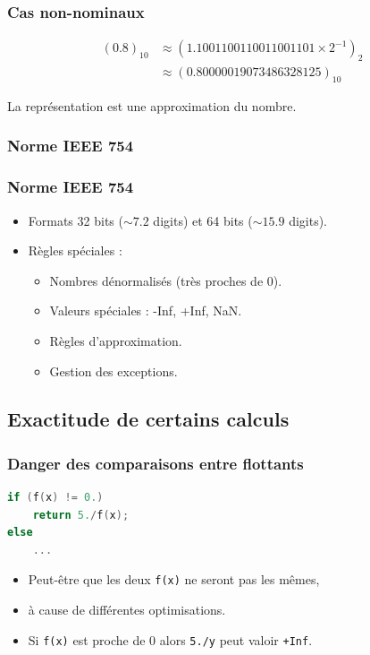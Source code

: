 \documentclass{beamer}
\begin{document}
\begin{frame}
    \frametitle{Cas non-nominaux}

    \begin{displaymath}
        \begin{split}
            (0.8)_{10} & \approx (1.1001100110011001101 \times 2^{-1})_{2} \\
            & \approx (0.80000019073486328125)_{10}
        \end{split}
    \end{displaymath}

    La représentation est une approximation du nombre.
\end{frame}

\subsubsection{Norme IEEE 754}

\begin{frame}
    \frametitle{Norme IEEE 754}

    \begin{itemize}
        \item Formats 32 bits ($\sim 7.2$ digits) et 64 bits ($\sim 15.9$ digits).
        \item Règles spéciales :
              \begin{itemize}
                  \item Nombres dénormalisés (très proches de $0$).
                  \item Valeurs spéciales : -Inf, +Inf, NaN.
                  \item Règles d'approximation.
                  \item Gestion des exceptions.
              \end{itemize}
    \end{itemize}
\end{frame}

\subsection{Exactitude de certains calculs}

\begin{frame}[fragile]
    \frametitle{Danger des comparaisons entre flottants}

    \begin{lstlisting}[language=c++]
if (f(x) != 0.)
    return 5./f(x);
else
    ...
    \end{lstlisting}

    \begin{itemize}
        \item Peut-être que les deux \verb'f(x)' ne seront pas les mêmes,
        \item à cause de différentes optimisations.
        \item Si \verb'f(x)' est proche de $0$ alors \verb'5./y' peut valoir \verb'+Inf'.
    \end{itemize}
\end{frame}
\end{document}
